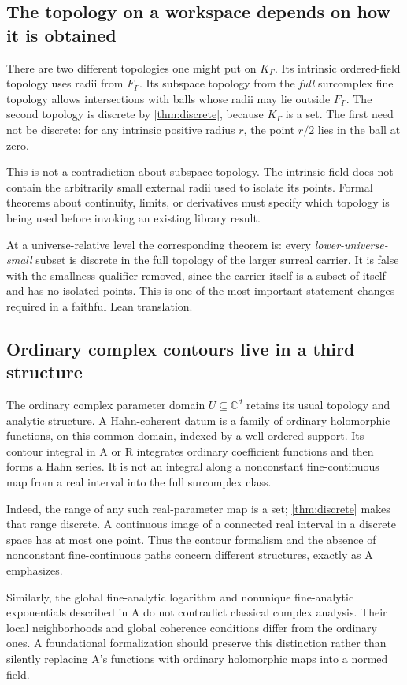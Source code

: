 \documentclass[11pt,letterpaper]{article}
\numberwithin{equation}{section}
\theoremstyle{definition}
\theoremstyle{remark}
\newcommand{\C}{\mathbb C}
\begin{document}
\subsection{The topology on a workspace depends on how it is obtained}
There are two different topologies one might put on $K_\Gamma$. Its intrinsic ordered-field topology uses radii from $F_\Gamma$. Its subspace topology from the \emph{full} surcomplex fine topology allows intersections with balls whose radii may lie outside $F_\Gamma$. The second topology is discrete by \cref{thm:discrete}, because $K_\Gamma$ is a set. The first need not be discrete: for any intrinsic positive radius $r$, the point $r/2$ lies in the ball at zero.

This is not a contradiction about subspace topology. The intrinsic field does not contain the arbitrarily small external radii used to isolate its points. Formal theorems about continuity, limits, or derivatives must specify which topology is being used before invoking an existing library result.

At a universe-relative level the corresponding theorem is: every \emph{lower-universe-small} subset is discrete in the full topology of the larger surreal carrier. It is false with the smallness qualifier removed, since the carrier itself is a subset of itself and has no isolated points. This is one of the most important statement changes required in a faithful Lean translation.

\subsection{Ordinary complex contours live in a third structure}
The ordinary complex parameter domain $U\subseteq\C^d$ retains its usual topology and analytic structure. A Hahn-coherent datum is a family of ordinary holomorphic functions, on this common domain, indexed by a well-ordered support. Its contour integral in A or R integrates ordinary coefficient functions and then forms a Hahn series. It is not an integral along a nonconstant fine-continuous map from a real interval into the full surcomplex class.

Indeed, the range of any such real-parameter map is a set; \cref{thm:discrete} makes that range discrete. A continuous image of a connected real interval in a discrete space has at most one point. Thus the contour formalism and the absence of nonconstant fine-continuous paths concern different structures, exactly as A emphasizes.

Similarly, the global fine-analytic logarithm and nonunique fine-analytic exponentials described in A do not contradict classical complex analysis. Their local neighborhoods and global coherence conditions differ from the ordinary ones. A foundational formalization should preserve this distinction rather than silently replacing A's functions with ordinary holomorphic maps into a normed field.
\end{document}
